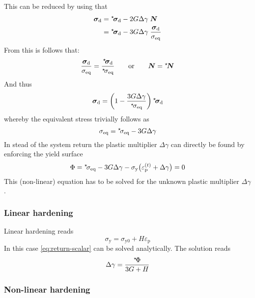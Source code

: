 \documentclass[namecite, fleqn]{goose-article}
\newcommand\leftstar[1]{\hspace*{-.3em}~^\star\!#1}
\begin{document}
This can be reduced by using that
\begin{align}
    \bm{\sigma}_\mathrm{d}
    &= \leftstar{\bm{\sigma}}_\mathrm{d}
     - 2 G \Delta \gamma \; \bm{N}
    \\
    &= \leftstar{\bm{\sigma}}_\mathrm{d}
    - 3 G \Delta \gamma \;
    \frac{
        \bm{\sigma}_\mathrm{d}
    }{
        \sigma_\mathrm{eq}
    }
\end{align}
From this is follows that:
\begin{equation}
    \frac{\bm{\sigma}_\mathrm{d}}{\sigma_\mathrm{eq}}
    = \frac{\leftstar{\bm{\sigma}}_\mathrm{d}}{\leftstar{\sigma}_\mathrm{eq}}
    \qquad
    \text{or}
    \qquad
    \bm{N}
    = \leftstar{\bm{N}}
\end{equation}
And thus
\begin{equation}
    \bm{\sigma}_\mathrm{d}
    = \left( 1 - \frac{3 G \Delta \gamma}{\leftstar{\sigma}_\mathrm{eq}} \right)
    \leftstar{\bm{\sigma}}_\mathrm{d}
\end{equation}
whereby the equivalent stress trivially follows as
\begin{equation}
    \sigma_\mathrm{eq} =
    \leftstar{\sigma}_\mathrm{eq} - 3 G \Delta \gamma
\end{equation}
In stead of the system return the plastic multiplier $\Delta \gamma$ can directly
be found by enforcing the yield surface
\begin{equation}
\label{eq:return-scalar}
    \Phi
    = \leftstar{\sigma}_\mathrm{eq}
    - 3 G \Delta \gamma
    - \sigma_\mathrm{y} \big( \varepsilon_\mathrm{p}^{(t)} + \Delta \gamma \big)
    = 0
\end{equation}
This (non-linear) equation has to be solved for the unknown plastic multiplier $\Delta \gamma$.

\subsubsection{Linear hardening}

Linear hardening reads
\begin{equation}
    \sigma_\mathrm{y} = \sigma_\mathrm{y0} + H \varepsilon_\mathrm{p}
\end{equation}
In this case \cref{eq:return-scalar} can be solved analytically.
The solution reads
\begin{equation}
    \Delta \gamma
    = \frac{ \leftstar{\Phi} }{ 3G + H }
\end{equation}

\subsubsection{Non-linear hardening}
\end{document}
